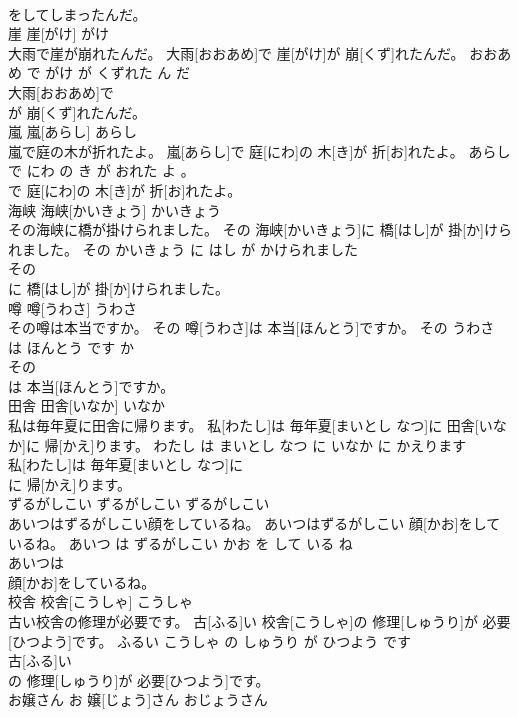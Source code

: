 \documentclass[8pt]{extreport}
\begin{document}
\begin{CJK}{UTF8}{min}
\\	をしてしまったんだ。			
\\	崖	崖[がけ]	がけ	
\\	大雨で崖が崩れたんだ。	大雨[おおあめ]で 崖[がけ]が 崩[くず]れたんだ。	おおあめ で がけ が くずれた ん だ	
\\	大雨[おおあめ]で
\\	が 崩[くず]れたんだ。			
\\	嵐	嵐[あらし]	あらし	
\\	嵐で庭の木が折れたよ。	嵐[あらし]で 庭[にわ]の 木[き]が 折[お]れたよ。	あらし で にわ の き が おれた よ 。	
\\	で 庭[にわ]の 木[き]が 折[お]れたよ。			
\\	海峡	海峡[かいきょう]	かいきょう	
\\	その海峡に橋が掛けられました。	その 海峡[かいきょう]に 橋[はし]が 掛[か]けられました。	その かいきょう に はし が かけられました	
\\	その
\\	に 橋[はし]が 掛[か]けられました。			
\\	噂	噂[うわさ]	うわさ	
\\	その噂は本当ですか。	その 噂[うわさ]は 本当[ほんとう]ですか。	その うわさ は ほんとう です か	
\\	その
\\	は 本当[ほんとう]ですか。			
\\	田舎	田舎[いなか]	いなか	
\\	私は毎年夏に田舎に帰ります。	私[わたし]は 毎年夏[まいとし なつ]に 田舎[いなか]に 帰[かえ]ります。	わたし は まいとし なつ に いなか に かえります	
\\	私[わたし]は 毎年夏[まいとし なつ]に
\\	に 帰[かえ]ります。			
\\	ずるがしこい	ずるがしこい	ずるがしこい	
\\	あいつはずるがしこい顔をしているね。	あいつはずるがしこい 顔[かお]をしているね。	あいつ は ずるがしこい かお を して いる ね	
\\	あいつは
\\	顔[かお]をしているね。			
\\	校舎	校舎[こうしゃ]	こうしゃ	
\\	古い校舎の修理が必要です。	古[ふる]い 校舎[こうしゃ]の 修理[しゅうり]が 必要[ひつよう]です。	ふるい こうしゃ の しゅうり が ひつよう です	
\\	古[ふる]い
\\	の 修理[しゅうり]が 必要[ひつよう]です。			
\\	お嬢さん	お 嬢[じょう]さん	おじょうさん	

\end{CJK}
\end{document}
